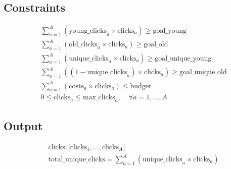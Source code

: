 \documentclass{article}
\begin{document}
\subsection*{Constraints}
\begin{align*}
    & \sum_{a=1}^{A} \left( \text{young\_clicks}_a \times \text{clicks}_a \right) \geq \text{goal\_young} \\
    & \sum_{a=1}^{A} \left( \text{old\_clicks}_a \times \text{clicks}_a \right) \geq \text{goal\_old} \\
    & \sum_{a=1}^{A} \left( \text{unique\_clicks}_a \times \text{clicks}_a \right) \geq \text{goal\_unique\_young} \\
    & \sum_{a=1}^{A} \left( (1 - \text{unique\_clicks}_a) \times \text{clicks}_a \right) \geq \text{goal\_unique\_old} \\
    & \sum_{a=1}^{A} \left( \text{costs}_a \times \text{clicks}_a \right) \leq \text{budget} \\
    & 0 \leq \text{clicks}_a \leq \text{max\_clicks}_a, \quad \forall a = 1, \ldots, A
\end{align*}

\subsection*{Output}
\begin{align*}
    & \text{clicks}: \Big[ \text{clicks}_1, \ldots, \text{clicks}_A \Big] \\
    & \text{total\_unique\_clicks} = \sum_{a=1}^{A} \left( \text{unique\_clicks}_a \times \text{clicks}_a \right)
\end{align*}
\end{document}
